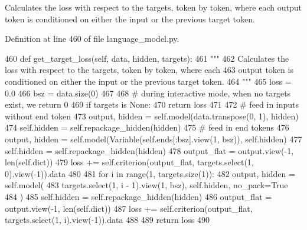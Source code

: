 \begin{DoxyVerb}Calculates the loss with respect to the targets, token by token, where each
output token is conditioned on either the input or the previous target token.
\end{DoxyVerb}
 

Definition at line 460 of file language\+\_\+model.\+py.


\begin{DoxyCode}
460     \textcolor{keyword}{def }get\_target\_loss(self, data, hidden, targets):
461         \textcolor{stringliteral}{"""}
462 \textcolor{stringliteral}{        Calculates the loss with respect to the targets, token by token, where each}
463 \textcolor{stringliteral}{        output token is conditioned on either the input or the previous target token.}
464 \textcolor{stringliteral}{        """}
465         loss = 0.0
466         bsz = data.size(0)
467 
468         \textcolor{comment}{# during interactive mode, when no targets exist, we return 0}
469         \textcolor{keywordflow}{if} targets \textcolor{keywordflow}{is} \textcolor{keywordtype}{None}:
470             \textcolor{keywordflow}{return} loss
471 
472         \textcolor{comment}{# feed in inputs without end token}
473         output, hidden = self.model(data.transpose(0, 1), hidden)
474         self.hidden = self.repackage\_hidden(hidden)
475         \textcolor{comment}{# feed in end tokens}
476         output, hidden = self.model(Variable(self.ends[:bsz].view(1, bsz)), self.hidden)
477         self.hidden = self.repackage\_hidden(hidden)
478         output\_flat = output.view(-1, len(self.dict))
479         loss += self.criterion(output\_flat, targets.select(1, 0).view(-1)).data
480 
481         \textcolor{keywordflow}{for} i \textcolor{keywordflow}{in} range(1, targets.size(1)):
482             output, hidden = self.model(
483                 targets.select(1, i - 1).view(1, bsz), self.hidden, no\_pack=\textcolor{keyword}{True}
484             )
485             self.hidden = self.repackage\_hidden(hidden)
486             output\_flat = output.view(-1, len(self.dict))
487             loss += self.criterion(output\_flat, targets.select(1, i).view(-1)).data
488 
489         \textcolor{keywordflow}{return} loss
490 
\end{DoxyCode}
\mbox{\label{classparlai_1_1agents_1_1language__model_1_1language__model_1_1LanguageModelAgent_a3b1a39e1467680e19dccfcfb8dae4273}} 
